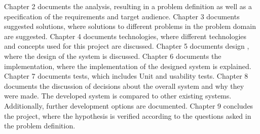 Chapter 2 documents the analysis, resulting in a problem definition as well as a specification of the requirements and target audience.
Chapter 3 documents suggested solutions, where solutions to different problems in the problem domain are suggested.
Chapter 4 documents technologies, where different technologies and concepts used for this project are discussed.
Chapter 5 documents design , where the design of the system is discussed.
Chapter 6 documents the implementation, where the implementation of the designed system is explained.
Chapter 7 documents tests, which includes Unit and usability tests. 
Chapter 8 documents the discussion of decisions about the overall system and why they were made. The developed system is compared to other existing systems. Additionally, further development options are documented.
Chapter 9 concludes the project, where the hypothesis is verified according to the questions asked in the problem definition.